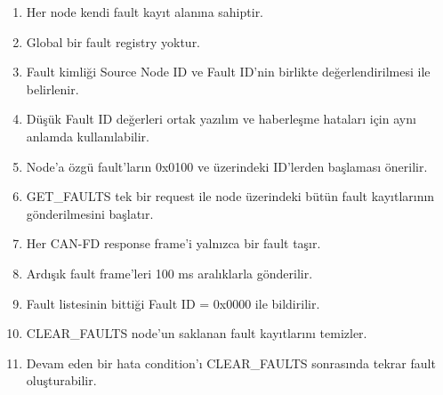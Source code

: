 \documentclass[a4paper,11pt]{article}
\begin{document}
\begin{enumerate}
    \item Her node kendi fault kayıt alanına sahiptir.
    
    \item Global bir fault registry yoktur.
    
    \item Fault kimliği Source Node ID ve Fault ID'nin birlikte
    değerlendirilmesi ile belirlenir.
    
    \item Düşük Fault ID değerleri ortak yazılım ve haberleşme
    hataları için aynı anlamda kullanılabilir.
    
    \item Node'a özgü fault'ların 0x0100 ve üzerindeki ID'lerden
    başlaması önerilir.
    
    \item GET\_FAULTS tek bir request ile node üzerindeki bütün
    fault kayıtlarının gönderilmesini başlatır.
    
    \item Her CAN-FD response frame'i yalnızca bir fault taşır.
    
    \item Ardışık fault frame'leri 100 ms aralıklarla gönderilir.
    
    \item Fault listesinin bittiği Fault ID = 0x0000 ile bildirilir.
    
    \item CLEAR\_FAULTS node'un saklanan fault kayıtlarını temizler.
    
    \item Devam eden bir hata condition'ı CLEAR\_FAULTS sonrasında
    tekrar fault oluşturabilir.
\end{enumerate}
\end{document}
